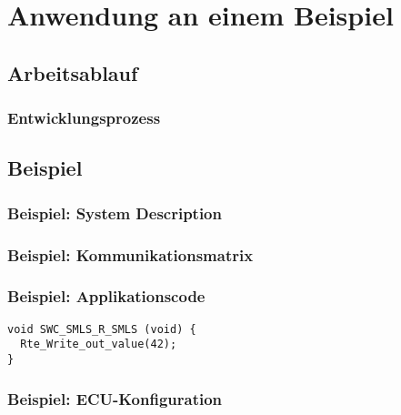 \documentclass[]{beamer}
\newcommand{\inputImage}[1]{}
\begin{document}
\section{Anwendung an einem Beispiel}
\label{sec:anwendung_beispiel}

\subsection{Arbeitsablauf}
\label{sec:arbeitsablauf}

\begin{frame}
\frametitle{Entwicklungsprozess}
    \begin{figure}[ht]
        \centering
        \resizebox{0.98\linewidth}{!}{\inputImage{Autosar_Prozess.dia}}
        \label{fig:autosar_prozess}
    \end{figure}
\end{frame}

\subsection{Beispiel}
\label{sec:beispiel}

\begin{frame}
\frametitle{Beispiel: System Description}
    \begin{figure}[ht]
        \centering
        \resizebox{\linewidth}{!}{\inputImage{SMLS_Modell.dia}}
        \label{fig:smls_modell2}
    \end{figure}
\end{frame}

\begin{frame}
\frametitle{Beispiel: Kommunikationsmatrix}

\end{frame}

\begin{frame}[fragile]
\frametitle{Beispiel: Applikationscode}
    \begin{verbatim}
void SWC_SMLS_R_SMLS (void) {
  Rte_Write_out_value(42);
}
    \end{verbatim}
\end{frame}

\begin{frame}
\frametitle{Beispiel: ECU-Konfiguration}

\end{frame}
\end{document}
